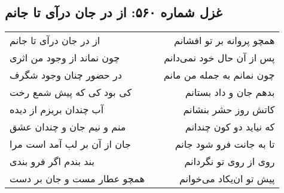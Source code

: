 \begin{center}
\section*{غزل شماره ۵۶۰: از در جان درآی تا جانم}
\label{sec:560}
\begin{longtable}{l p{0.5cm} r}
از در جان درآی تا جانم
&&
همچو پروانه بر تو افشانم
\\
چون نماند از وجود من اثری
&&
پس از آن حال خود نمی‌دانم
\\
در حضور چنان وجود شگرف
&&
چون نمانم به جمله من مانم
\\
کی بود کی که پیش شمع رخت
&&
بدهم جان و داد بستانم
\\
آب چندان بریزم از دیده
&&
کاتش روز حشر بنشانم
\\
منم و نیم جان و چندان عشق
&&
که نیاید دو کون چندانم
\\
جان از آن بر لب آمد است مرا
&&
تا به جانت فرو شود جانم
\\
بند بندم اگر فرو بندی
&&
روی از روی تو نگردانم
\\
همچو عطار مست و جان بر دست
&&
پیش تو ان‌یکاد می‌خوانم
\\
\end{longtable}
\end{center}

